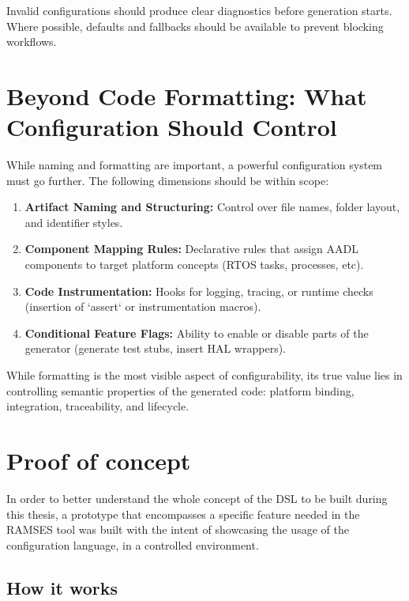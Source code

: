 Invalid configurations should produce clear diagnostics before generation starts. Where possible, defaults and fallbacks should be available to prevent blocking workflows.

\section{Beyond Code Formatting: What Configuration Should Control}
\label{sec:config_scope}

While naming and formatting are important, a powerful configuration system must go further. The following dimensions should be within scope:

\begin{enumerate}
	\item \textbf{Artifact Naming and Structuring:} Control over file names, folder layout, and identifier styles.
	\item \textbf{Component Mapping Rules:} Declarative rules that assign AADL components to target platform concepts (RTOS tasks, processes, etc).
	\item \textbf{Code Instrumentation:} Hooks for logging, tracing, or runtime checks (insertion of `assert` or instrumentation macros).
	\item \textbf{Conditional Feature Flags:} Ability to enable or disable parts of the generator (generate test stubs, insert HAL wrappers).
\end{enumerate}

\begin{tcolorbox}[colback=blue!5, colframe=blue!50!black, title=Configuration is More Than Style]
	While formatting is the most visible aspect of configurability, its true value lies in controlling semantic properties of the generated code: platform binding, integration, traceability, and lifecycle.
\end{tcolorbox}

\section{Proof of concept}
\label{sec:proof_of_concept}

In order to better understand the whole concept of the \gls{DSL} to be built during this thesis, a prototype that encompasses a specific feature needed in the RAMSES tool was built with the intent of showcasing the usage of the configuration language, in a controlled environment.

\subsection{How it works}
\label{sec:how_it_works}

